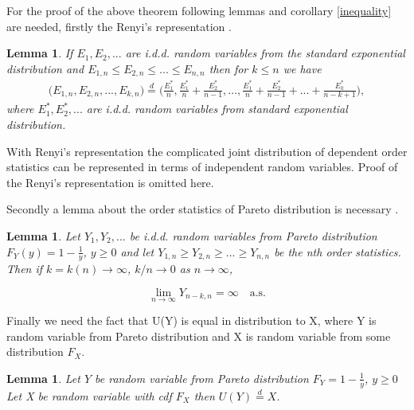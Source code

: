 \documentclass[english,12pt,a4paper,pdftex,sci,utf8]{aaltothesis} %
\newtheorem{lemma}[theorem]{Lemma}
\begin{document}
For the proof of the above theorem following lemmas and corollary \ref{inequality} are needed, firstly the Renyi's representation \cite{renyi}.
\begin{lemma}
If $E_1, E_2,...$ are i.d.d. random variables from the standard exponential distribution and $E_{1,n} \leq E_{2,n} \leq ... \leq E_{n,n}$ then for $k \leq n$ we have
\begin{multline*}
\big(E_{1,n}, E_{2,n}, ... , E_{k,n}\big) 
\overset{d}{=} \Big(\frac{E_1^*}{n}, \frac{E_1^*}{n}+\frac{E_2^*}{n-1}, ... , \frac{E_1^*}{n}+\frac{E_2^*}{n-1}+...+ \frac{E_k^*}{n-k+1}\Big),
\end{multline*}
where $E_1^*,E_2^*,...$ are i.d.d. random variables from standard exponential distribution.
\label{renrep}
\end{lemma}

With Renyi's representation the complicated joint distribution of dependent order statistics can be represented in terms of independent random variables. Proof of the Renyi's representation is omitted here.

Secondly a lemma about the order statistics of Pareto distribution is necessary \cite{deHaan}.

\begin{lemma}
Let $Y_1, Y_2, ...$ be i.d.d. random variables from Pareto distribution $F_Y(y)=1-\frac{1}{y}$, $y \geq 0$ and let $Y_{1,n} \geq Y_{2,n} \geq ... \geq Y_{n,n}$ be the nth order statistics. Then if $k=k(n)  \rightarrow \infty$, $k/n \rightarrow 0$ as $n \rightarrow \infty$,

\begin{equation*}
\lim_{n\to\infty} Y_{n-k,n} = \infty  \quad  \text{a.s}.
\end{equation*}
\label{asconv}
\end{lemma}


Finally we need the fact that U(Y) is equal in distribution to X, where Y is random variable from Pareto distribution and X is random variable from some distribution $F_X$.

\begin{lemma}
Let $Y$ be random variable from Pareto distribution $F_Y=1-\frac{1}{y}$, $y \geq 0$ Let X be random variable with cdf $F_X$ then $U(Y) \overset{d}{=} X$.
\label{U}
\end{lemma}
\end{document}
